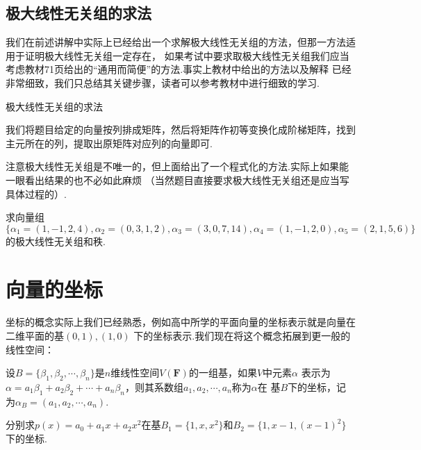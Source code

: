 \subsection{极大线性无关组的求法}
我们在前述讲解中实际上已经给出一个求解极大线性无关组的方法，但那一方法适用于证明极大线性无关组一定存在，
如果考试中要求取极大线性无关组我们应当考虑教材71页给出的``通用而简便''的方法.事实上教材中给出的方法以及解释
已经非常细致，我们只总结其关键步骤，读者可以参考教材中进行细致的学习.
\begin{lemma}
    极大线性无关组的求法

    我们将题目给定的向量按列排成矩阵，然后将矩阵作初等变换化成阶梯矩阵，找到主元所在的列，提取出原矩阵对应列的向量即可.
\end{lemma}

注意极大线性无关组是不唯一的，但上面给出了一个程式化的方法.实际上如果能一眼看出结果的也不必如此麻烦
（当然题目直接要求极大线性无关组还是应当写具体过程的）.
\begin{example}\label{ex:3:求解极大线性无关组}
	求向量组$\{\alpha_1=(1,-1,2,4),\alpha_2=(0,3,1,2),\alpha_3=(3,0,7,14),\alpha_4=(1,-1,2,0),\alpha_5=(2,1,5,6)\}$
	的极大线性无关组和秩.
\end{example}

\section{向量的坐标}
坐标的概念实际上我们已经熟悉，例如高中所学的平面向量的坐标表示就是向量在二维平面的基$(0,1),(1,0)$
下的坐标表示.我们现在将这个概念拓展到更一般的线性空间：
\begin{definition}
	设$B=\{\beta_1,\beta_2,\cdots,\beta_n\}$是$n$维线性空间$V(\mathbf{F})$的一组基，如果$V$中元素$\alpha$
	表示为$\alpha=a_1\beta_1+a_2\beta_2+\cdots+a_n\beta_n$，则其系数组$a_1,a_2,\cdots,a_n$称为$\alpha$在
	基$B$下的坐标，记为$\alpha_B=(a_1,a_2,\cdots,a_n)$.
\end{definition}
\begin{example}
	分别求$p(x)=a_0+a_1x+a_2x^2$在基$B_1=\{1,x,x^2\}$和$B_2=\{1,x-1,(x-1)^2\}$下的坐标.
\end{example}

